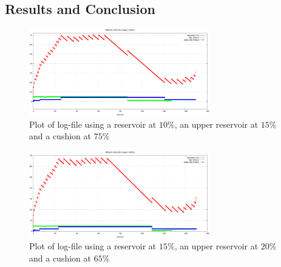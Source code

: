 \documentclass[a4paper]{report}
\begin{document}
\subsection{Results and Conclusion}

\begin{figure}[H]
  \begin{center}
    \includegraphics[width=0.7\textwidth]{res_ten_cushion_seventyfive}
  \end{center}
  \caption{Plot of log-file using a reservoir at $10\%$, an upper reservoir at $15\%$ and a cushion at $75\%$}\label{resten}
\end{figure}

\begin{figure}[H]
  \begin{center}
    \includegraphics[width=0.7\textwidth]{res_fifteen_cushion_sixtyfive}
  \end{center}
  \caption{Plot of log-file using a reservoir at $15\%$, an upper reservoir at $20\%$ and a cushion at $65\%$}\label{resfifteen}
\end{figure}





\end{document}

